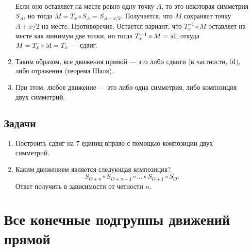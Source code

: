 \begin{enumerate}
Если оно оставляет на месте ровно одну точку $A$, то это некоторая симметрия $S_A$, но тогда $M=T_x\circ S_A=S_{A+x/2}$. Получается, что $M$ сохраняет точку $A+x/2$ на месте. Противоречие. Остается вариант, что $T_{x}^{-1}\circ M$ оставляет на месте как минимум две точки, но тогда $T_{x}^{-1}\circ M=\mathrm{id}$, откуда $M=T_x\circ \mathrm{id}=T_x$ --- сдвиг.
\item Таким образом, все движения прямой --- это либо сдвиги (в частности, $\mathrm{id}$), либо отражения (теорема Шаля).
\item При этом, любое движение --- это либо одна симметрия, либо композиция двух симметрий.
\end{enumerate}
\subsection*{Задачи}
\begin{enumerate}
\item Построить сдвиг на 7 единиц вправо с помощью композиции двух симметрий.
\item Каким движением является следующая композиция?
$$
S_{O+n}\circ S_{O+n-1}\circ \dots\circ S_{O+1}\circ S_O.
$$
Ответ получить в зависимости от четности $n$.
\end{enumerate}


\section{Все конечные подгруппы движений прямой}





